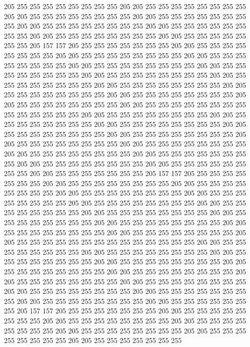 205 255 255 255 255 255 255 255 255 205 205 255 255 255 255 255 255 255 255 205
205 255 255 255 255 255 255 255 255 205 205 255 255 255 255 255 255 255 255 205
205 255 255 255 255 255 255 255 255 205 205 255 255 255 255 255 255 255 255 205
205 255 255 255 255 255 255 255 255 205 205 255 255 255 255 255 255 255 205 157
157 205 255 255 255 255 255 255 255 205 205 255 255 255 255 255 255 255 255 205
205 255 255 255 255 255 255 255 255 205 205 255 255 255 255 255 255 255 255 205
205 255 255 255 255 255 255 255 255 205 205 255 255 255 255 255 255 255 255 205
205 255 255 255 255 255 255 255 255 205 205 255 255 255 255 255 255 255 255 205
205 255 255 255 255 255 255 255 255 205 205 255 255 255 255 255 255 255 255 205
205 255 255 255 255 255 255 255 255 205 205 255 255 255 255 255 255 255 255 205
205 255 255 255 255 255 255 255 255 255 255 255 255 255 255 205 205 255 255 255
255 255 255 255 255 205 205 255 255 255 255 255 255 255 255 205 205 255 255 255
255 255 255 255 255 205 205 255 255 255 255 255 255 255 255 205 205 255 255 255
255 255 255 255 255 205 205 255 255 255 255 255 255 255 255 205 205 255 255 255
255 255 255 255 255 205 205 255 255 255 255 255 255 255 255 205 205 255 255 255
255 255 255 255 255 205 205 255 255 255 255 255 255 255 255 205 205 255 255 255
255 255 255 255 255 205 205 255 255 255 255 255 255 255 205 157 157 205 255 255
255 255 255 255 255 205 205 255 255 255 255 255 255 255 255 205 205 255 255 255
255 255 255 255 255 205 205 255 255 255 255 255 255 255 255 205 205 255 255 255
255 255 255 255 255 205 205 255 255 255 255 255 255 255 255 205 205 255 255 255
255 255 255 255 255 205 205 255 255 255 255 255 255 255 255 205 205 255 255 255
255 255 255 255 255 205 205 255 255 255 255 255 255 255 255 205 205 255 255 255
255 255 255 255 255 205 205 255 255 255 255 255 255 255 255 205 205 255 255 255
255 255 255 255 255 255 255 255 255 255 255 205 205 255 255 255 255 255 255 255
255 205 205 255 255 255 255 255 255 255 255 205 205 255 255 255 255 255 255 255
255 205 205 255 255 255 255 255 255 255 255 205 205 255 255 255 255 255 255 255
255 205 205 255 255 255 255 255 255 255 255 205 205 255 255 255 255 255 255 255
255 205 205 255 255 255 255 255 255 255 255 205 205 255 255 255 255 255 255 255
255 205 205 255 255 255 255 255 255 255 255 205 205 255 255 255 255 255 255 255
255 205 205 255 255 255 255 255 255 255 205 157 157 205 255 255 255 255 255 255
255 205 205 255 255 255 255 255 255 255 255 205 205 255 255 255 255 255 255 255
255 205 205 255 255 255 255 255 255 255 255 205 205 255 255 255 255 255 255 255
255 205 205 255 255 255 255 255 255 255 255 205 205 255 255 255 255 255 255 255
